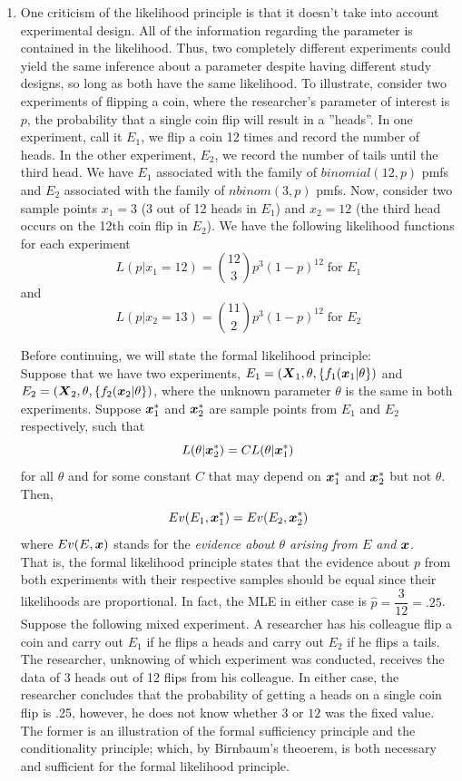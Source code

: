 \documentclass[12pt]{article}\usepackage[]{graphicx}\usepackage[]{color}
\newcommand{\bfX}{\mbox{\boldmath $X$}}
\newcommand{\bfx}{\mbox{\boldmath $x$}}
\begin{document}
\begin{enumerate}
\begin{itemize}
\end{itemize} 
\item One criticism of the likelihood principle is that it doesn't take into account experimental design. All of the information regarding the parameter is contained in the likelihood. Thus, two completely different experiments could yield the same inference about a parameter despite having different study designs, so long as both have the same likelihood. To illustrate, consider two experiments of flipping a coin, where the researcher's parameter of interest is $p$, the probability that a single coin flip will result in a ''heads''. In one experiment, call it $E_1$, we flip a coin 12 times and record the number of heads. In the other experiment, $E_2$, we record the number of tails until the third head. We have $E_1$ associated with the family of $binomial(12,p)$ pmfs and $E_2$ associated with the family of $nbinom(3,p)$ pmfs. Now, consider two sample points $x_1 = 3$ (3 out of 12 heads in $E_1$) and $x_2 = 12$ (the third head occurs on the 12th coin flip in $E_2$). We have the following likelihood functions for each experiment
$$L(p|x_1=12) = {12 \choose 3} p^3 (1-p)^{12} \; \text{for } E_1$$
and
$$L(p|x_2=13) = {11 \choose 2} p^3 (1-p)^{12} \; \text{for } E_2$$

Before continuing, we will state the formal likelihood principle:\\

Suppose that we have two experiments, $E_1 = ( \bfX_1, \theta, \{ f_1( \bfx_1 | \theta \})$ and  $E_2 = ( \bfX_2, \theta, \{ f_2( \bfx_2 | \theta \})$, where the unknown parameter $\theta$ is the same in both experiments. Suppose $\bfx_1^*$ and $\bfx_2^*$ are sample points from $E_1$ and $E_2$ respectively, such that
$$L(\theta | \bfx_2^*) = C L(\theta | \bfx_1^*)$$
for all $\theta$ and for some constant $C$ that may depend on $\bfx_1^*$ and $\bfx_2^*$ but not $\theta$.
Then,
\[Ev(E_1, \bfx_1^*) = Ev(E_2, \bfx_2^*)\]
where $Ev(E, \bfx)$ stands for the \emph{evidence about $\theta$ arising from $E$ and $\bfx$}.\\

That is, the formal likelihood principle states that the evidence about $p$ from both experiments with their respective samples should be equal since their likelihoods are proportional. In fact, the MLE in either case is $\hat{p} = \dfrac{3}{12} = .25$.  Suppose the following mixed experiment. A researcher has his colleague flip a coin and carry out $E_1$ if he flips a heads and carry out $E_2$ if he flips a tails. The researcher, unknowing of which experiment was conducted, receives the data of 3 heads out of 12 flips from his colleague. In either case, the researcher concludes that the probability of getting a heads on a single coin flip is .25, however, he does not know whether $3$ or $12$ was the fixed value. The former is an illustration of the formal sufficiency principle and the conditionality principle; which, by Birnbaum's theoerem, is both necessary and sufficient for the formal likelihood principle.\\


\end{enumerate}
\end{document}

